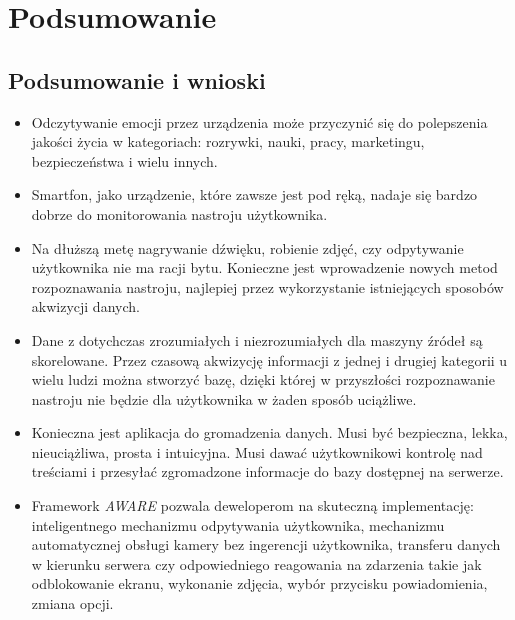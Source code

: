 \chapter{Podsumowanie}
\label{cha:podsumowanie}



\section{Podsumowanie i wnioski}
\label{sec:podsumowanieIWnioski}


\begin{itemize}
	\item Odczytywanie emocji przez urządzenia może przyczynić się do polepszenia jakości życia w kategoriach: rozrywki, nauki, pracy, marketingu, bezpieczeństwa i wielu innych.
	
	\item Smartfon, jako urządzenie, które zawsze jest pod ręką, nadaje się bardzo dobrze do monitorowania nastroju użytkownika.
	
	\item Na dłuższą metę nagrywanie dźwięku, robienie zdjęć, czy odpytywanie użytkownika nie ma racji bytu. Konieczne jest wprowadzenie nowych metod rozpoznawania nastroju, najlepiej przez wykorzystanie istniejących sposobów akwizycji danych.
	
	\item Dane z dotychczas zrozumiałych i niezrozumiałych dla maszyny źródeł są skorelowane. Przez czasową akwizycję informacji z jednej i drugiej kategorii u wielu ludzi można stworzyć bazę, dzięki której w przyszłości rozpoznawanie nastroju nie będzie dla użytkownika w żaden sposób uciążliwe.
	
	\item Konieczna jest aplikacja do gromadzenia danych. Musi być bezpieczna, lekka, nieuciążliwa, prosta i intuicyjna. Musi dawać użytkownikowi kontrolę nad treściami i przesyłać zgromadzone informacje do bazy dostępnej na serwerze.
	
	\item Framework \textit{AWARE} pozwala deweloperom na skuteczną implementację: inteligentnego mechanizmu odpytywania użytkownika, mechanizmu automatycznej obsługi kamery bez ingerencji użytkownika, transferu danych w kierunku serwera czy odpowiedniego reagowania na zdarzenia takie jak odblokowanie ekranu, wykonanie zdjęcia, wybór przycisku powiadomienia, zmiana opcji.
\end{itemize}
\clearpage


